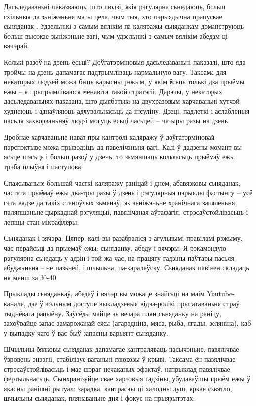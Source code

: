Дасьледаваньні паказваюць, што людзі, якія рэгулярна сьнедаюць, больш схільныя да зьніжэньня масы цела, чым тыя, хто пэрыядычна прапускае сьняданак . Удзельнікі з самым вялікім па каляражы сьняданкам дэманструюць больш высокае зьніжэньне вагі, чым удзельнікі з самым вялікім абедам ці вячэрай.

Колькі разоў на дзень есьці? Доўгатэрміновыя дасьледаваньні паказалі, што яда тройчы на дзень дапамагае падтрымліваць нармальную вагу. Таксама для некаторых людзей можа быць карысны рэжым, у якім ёсьць толькі два прыёмы ежы – я прытрымліваюся менавіта такой стратэгіі. Дарэчы, у некаторых дасьледаваньнях паказана, што дыябэтыкі на двухразовым харчаваньні хутчэй худнеюць і аднаўляюць адчувальнасьць да інсуліну. Дзеці, падлеткі і аслабленыя пасьля захворваньняў людзі могуць есьці часьцей – чатыры разы на дзень.

Дробнае харчаваньне нават пры кантролі каляражу ў доўгатэрміновай пэрспэктыве можа прыводзіць да павелічэньня вагі. Калі ў дадзены момант вы ясьце шэсьць і больш разоў у дзень, то зьмяншаць колькасьць прыёмаў ежы трэба плыўна і паступова.

Спажываньне большай часткі каляражу раніцай і днём, абавязковы сьняданак, частата прыёмаў ежы два-тры разы ў дзень і рэгулярныя пэрыяды фастынгу – усё гэта вядзе да такіх станоўчых зьменаў, як зьніжэньне хранічнага запаленьня, паляпшэньне цыркаднай рэгуляцыі, павялічаная аўтафагія, стрэсаўстойлівасьць і лепшы стан мікрафлёры.

Сьняданак і вячэра. Цяпер, калі вы разабраліся з агульнымі правіламі рэжыму, час перайсьці да прыёмаў ежы: сьняданку, абеду і вячэры. Я рэкамэндую рэгулярна сьнедаць у адзін і той жа час, на працягу гадзіны-паўтары пасьля абуджэньня – не пазьней, і шчыльна, па-каралеўску. Сьняданак павінен складаць ня менш за 30-40%

Прыклады сьняданкаў, абедаў і вячэр вы можаце знайсьці на маім Youtube-канале, дзе ў вольным доступе выкладзеныя відэа-ролікі прыгатаваньня страў тыднёвага рацыёну. Заўсёды майце зь вечара плян сьняданку на раніцу, захоўвайце запас замарожанай ежы (агародніна, мяса, рыба, ягады, зеляніна), каб у выпадку чаго ў вас быў запасны варыянт сьняданку.

Шчыльны бялковы сьняданак дапамагае кантраляваць насычэньне, павялічвае ўзровень энэргіі, стабілізуе ваганьні глюкозы ў крыві. Таксама ён павялічвае стрэсаўстойлівасьць і мае шэраг нечаканых эфэктаў, напрыклад павялічвае фертыльнасьць. Сынхранізуйце свае харчовыя гадзіны, убудаваўшы прыём ежы ў якасны ранішні рытуал: зарадка, кантрасны ці халодны душ, яркае сьвятло, шчыльны сьняданак, плянаваньне дня і фокус на прыярытэтах.

